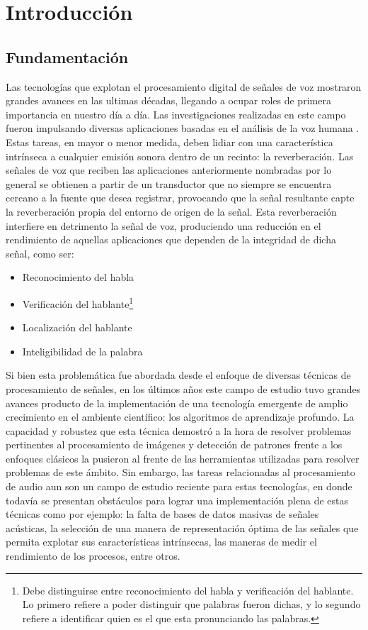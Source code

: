 \section{Introducción} 
\subsection{Fundamentación}
Las tecnologías que explotan el procesamiento digital de señales de voz mostraron grandes avances en las ultimas décadas, llegando a ocupar roles de primera importancia en nuestro día a día. Las investigaciones realizadas en este campo fueron impulsando diversas aplicaciones basadas en el análisis de la voz humana \cite{fun1}\cite{fun2}. 
Estas tareas, en mayor o menor medida, deben lidiar con una característica intrínseca a cualquier emisión sonora dentro de un recinto: la reverberación. Las señales de voz que reciben las aplicaciones anteriormente nombradas por lo general se obtienen a partir de un transductor que no siempre se encuentra cercano a la fuente que desea registrar, provocando que la señal resultante capte la reverberación propia del entorno de origen de la señal. Esta reverberación interfiere en detrimento la señal de voz, produciendo una reducción en el rendimiento de aquellas aplicaciones que dependen de la integridad de dicha señal, como ser: 

\begin{itemize}
    \item Reconocimiento del habla \cite{reconocimiento}
    \item Verificación del hablante\footnote{Debe distinguirse entre reconocimiento del habla y verificación del hablante. Lo primero refiere a poder distinguir que palabras fueron dichas, y lo segundo refiere a identificar quien es el que esta pronunciando las palabras.} \cite{verificacion}
    
    \item Localización del hablante \cite{localizacion}
    \item Inteligibilidad de la palabra
\end{itemize}


Si bien esta problemática fue abordada desde el enfoque de diversas técnicas de procesamiento de señales, en los últimos años este campo de estudio tuvo grandes avances producto de la implementación de una tecnología emergente de amplio crecimiento en el ambiente científico: los algoritmos de aprendizaje profundo. La capacidad y robustez que esta técnica demostró a la hora de resolver problemas pertinentes al procesamiento de imágenes y detección de patrones frente a los enfoques clásicos la pusieron al frente de las herramientas utilizadas para resolver problemas de este ámbito. Sin embargo, las tareas relacionadas al procesamiento de audio aun son un campo de estudio reciente para estas tecnologías, en donde todavía se presentan obstáculos para lograr una implementación plena de estas técnicas como por ejemplo: la falta de bases de datos masivas de señales acústicas, la selección de una manera de representación óptima de las señales que permita explotar sus características intrínsecas, las maneras de medir el rendimiento de los procesos, entre otros.

